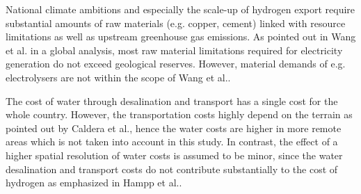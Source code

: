 National climate ambitions and especially the scale-up of hydrogen export require substantial amounts of raw materials (e.g. copper, cement) linked with resource limitations as well as upstream greenhouse gas emissions. As pointed out in Wang et al.\cite{Wang2023} in a global analysis, most raw material limitations required for electricity generation do not exceed geological reserves. However, material demands of e.g. electrolysers are not within the scope of Wang et al.\cite{Wang2023}.

The cost of water through desalination and transport has a single cost for the whole country. However, the transportation costs highly depend on the terrain as pointed out by Caldera et al.\cite{Caldera2016}, hence the water costs are higher in more remote areas which is not taken into account in this study. In contrast, the effect of a higher spatial resolution of water costs is assumed to be minor, since the water desalination and transport costs do not contribute substantially to the cost of hydrogen as emphasized in Hampp et al.\cite{Hampp2023}.